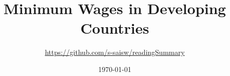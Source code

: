 \documentclass[a4paper, 12pt]{article}
\begin{document}
\pagestyle{fancy}
\setlength{\parindent}{5ex}
\setlength{\columnseprule}{0.5pt}

\title{Minimum Wages in Developing Countries}
\author{\url{https://github.com/s-saisw/readingSummary}}
\date{\today}
\maketitle

\lhead{}
\end{document}
